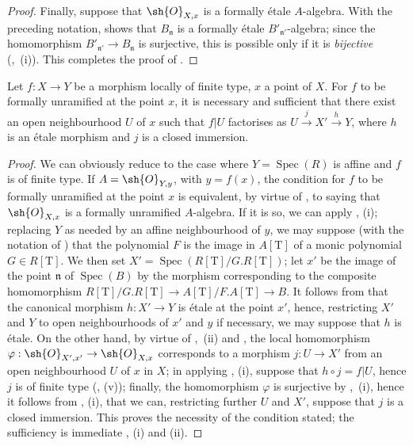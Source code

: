 \begin{proof}
Finally, suppose that $\sh{O}_{X,x}$ is a formally \'etale $A$-algebra.
With the preceding notation,  shows that $B_\mathfrak{n}$ is a formally \'etale $B'_{\mathfrak{n}'}$-algebra; since the homomorphism $B'_{\mathfrak{n}'}\to B_\mathfrak{n}$ is surjective, this is possible only if it is \emph{bijective} (,~(i)).
This completes the proof of .
\end{proof}

\begin{corollary}[18.4.7]
\label{IV.18.4.7}
Let $f:X\to Y$ be a morphism locally of finite type, $x$ a point of $X$.
For $f$ to be formally unramified at the point $x$, it is necessary and sufficient that there exist an open neighbourhood $U$ of $x$ such that $f|U$ factorises as $U\xrightarrow{j}X'\xrightarrow{h}Y$, where $h$ is an \'etale morphism and $j$ is a closed immersion.
\end{corollary}

\begin{proof}
We can obviously reduce to the case where $Y=\operatorname{Spec}(R)$ is affine and $f$ is of finite type.
If $A=\sh{O}_{Y,y}$, with $y=f(x)$, the condition for $f$ to be formally unramified at the point $x$ is equivalent, by virtue of , to saying that $\sh{O}_{X,x}$ is a formally unramified $A$-algebra.
If it is so, we can apply , (i);
replacing $Y$ as needed by an affine neighbourhood of $y$, we may suppose (with the notation of ) that the polynomial $F$ is the image in $A[\mathrm{T}]$ of a monic polynomial $G\in R[\mathrm{T}]$.
We then set $X'=\operatorname{Spec}(R[\mathrm{T}]/G.R[\mathrm{T}])$;
let $x'$ be the image of the point $\mathfrak{n}$ of $\operatorname{Spec}(B)$ by the morphism corresponding to the composite homomorphism $R[\mathrm{T}]/G.R[\mathrm{T}]\to A[\mathrm{T}]/F.A[\mathrm{T}]\to B$.
It follows from  that the canonical morphism $h:X'\to Y$ is \'etale at the point $x'$, hence, restricting $X'$ and $Y$ to open neighbourhoods of $x'$ and $y$ if necessary, we may suppose that $h$ is \'etale.
On the other hand, by virtue of ,~(ii) and , the local homomorphism $\varphi:\sh{O}_{X',x'}\to\sh{O}_{X,x}$ corresponds to a morphism
$j:U\to X'$ from an open neighbourhood $U$ of $x$ in $X$;
in applying , (i), suppose that $h\circ j=f|U$, hence $j$ is of finite type (, (v));
finally, the homomorphism $\varphi$ is surjective by ,~(i), hence it follows from , (i), that we can, restricting further $U$ and $X'$, suppose that $j$ is a closed immersion.
This proves the necessity of the condition stated;
the sufficiency is immediate , (i) and (ii).
\end{proof}

